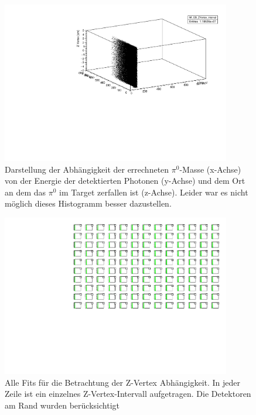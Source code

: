 \documentclass[a4paper,11pt,oneside,final,german,openbib,pdftex]{scrbook}
\begin{document}
{\begin{appendix}
\begin{figure}[h!]
	\begin{center}
		\includegraphics[width=100mm]{20171804ZVertex3DHist}
		\caption{Darstellung der Abh\"angigkeit der errechneten $\pi^0$-Masse (x-Achse) von der Energie der detektierten Photonen (y-Achse) und dem Ort an dem das $\pi^0$ im Target zerfallen ist (z-Achse).
		Leider war es nicht m\"oglich dieses Histogramm besser dazustellen.}
	\label{fig:Z-Vertex-3D-Hist}
	\end{center}
\end{figure}


\begin{figure}[h!]
	\begin{center}
		\includegraphics[width=100mm]{20171804ZVertexAllFits}
		\caption{Alle Fits f\"ur die Betrachtung der Z-Vertex Abh\"angigkeit. In jeder Zeile ist ein einzelnes Z-Vertex-Intervall aufgetragen. Die Detektoren am Rand wurden ber\"ucksichtigt}
		\label{fig:ZVertex-All-Fits}
	\end{center}
\end{figure}


\end{appendix}}
\end{document}
